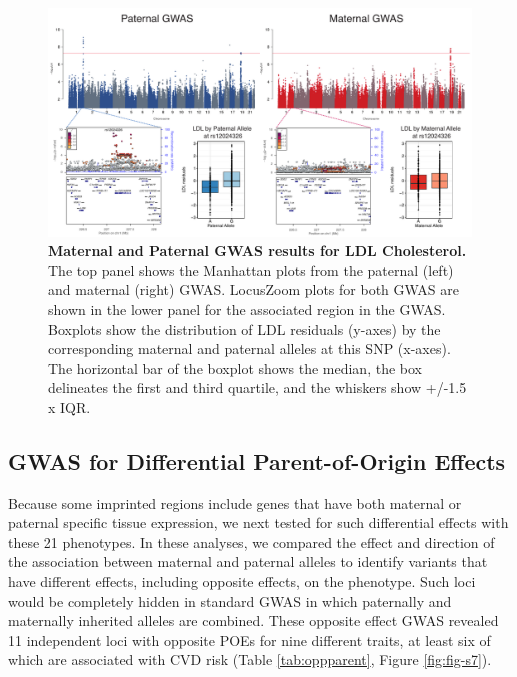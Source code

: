 \begin{figure}[!htb]
\centering \includegraphics[width=6in]{img/ch02/fig-02-ldl_matpatgwas.pdf}
\caption[Maternal and Paternal GWAS results for LDL Cholesterol.]{\textbf{Maternal and Paternal GWAS results for LDL Cholesterol.}  The top panel shows the Manhattan plots from the paternal (left) and maternal (right) GWAS. LocusZoom plots for both GWAS are shown in the lower panel for the associated region in the GWAS. Boxplots show the distribution of LDL residuals (y-axes) by the corresponding maternal and paternal alleles at this SNP (x-axes). The horizontal bar of the boxplot shows the median, the box delineates the first and third quartile, and the whiskers show +/-1.5 x IQR.}
\label{fig:ldl_mpgwas}
\end{figure}


\subsection{GWAS for Differential Parent-of-Origin Effects}\label{GWAS for Differential Parent-of-Origin Effects}

Because some imprinted regions include genes that have both maternal or paternal specific tissue expression, we next tested for such differential effects with these 21 phenotypes. In these analyses, we compared the effect and direction of the association between maternal and paternal alleles to identify variants that have different effects, including opposite effects, on the phenotype. Such loci would be completely hidden in standard GWAS in which paternally and maternally inherited alleles are combined. These opposite effect GWAS revealed 11 independent loci with opposite POEs for nine different traits, at least six of which are associated with CVD risk (Table \ref{tab:oppparent}, Figure \ref{fig:fig-s7}). 


